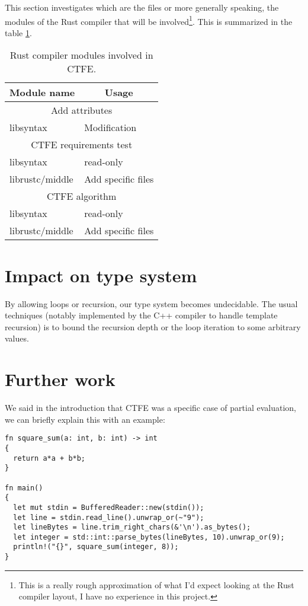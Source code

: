 \documentclass[a4paper,11pt]{article}
\begin{document}
This section investigates which are the files or more generally speaking, the modules of the Rust compiler that will be involved\footnote{This is a really rough approximation of what I'd expect looking at the Rust compiler layout, I have no experience in this project.}. This is summarized in the table \ref{rust-changes}.
\newline

\begin{table}[h!]
\begin{tabular}{| l | l |} \hline 
\multicolumn{1}{|c|}{\textbf{Module name}} & \multicolumn{1}{|c|}{\textbf{Usage}} \\ \hline
\multicolumn{2}{|c|}{Add attributes} \\ \hline
libsyntax & Modification \\ \hline
\multicolumn{2}{|c|}{CTFE requirements test} \\ \hline
libsyntax & read-only \\ \hline
librustc/middle & Add specific files \\ \hline
\multicolumn{2}{|c|}{CTFE algorithm} \\ \hline
libsyntax & read-only \\ \hline
librustc/middle & Add specific files \\ \hline
\end{tabular}
\centering
\caption{Rust compiler modules involved in CTFE.}
\label{rust-changes}
\end{table}

\section{Impact on type system}
\label{impact-type}

By allowing loops or recursion, our type system becomes undecidable. The usual techniques (notably implemented by the C++ compiler to handle template recursion) is to bound the recursion depth or the loop iteration to some arbitrary values.

\section{Further work}
\label{further-work}

We said in the introduction that CTFE was a specific case of partial evaluation\cite{PE}, we can briefly explain this with an example:

\begin{lstlisting}
fn square_sum(a: int, b: int) -> int
{
  return a*a + b*b;
}

fn main()
{
  let mut stdin = BufferedReader::new(stdin());
  let line = stdin.read_line().unwrap_or(~"9");
  let lineBytes = line.trim_right_chars(&'\n').as_bytes();
  let integer = std::int::parse_bytes(lineBytes, 10).unwrap_or(9);
  println!("{}", square_sum(integer, 8));
}
\end{lstlisting}
\end{document}
